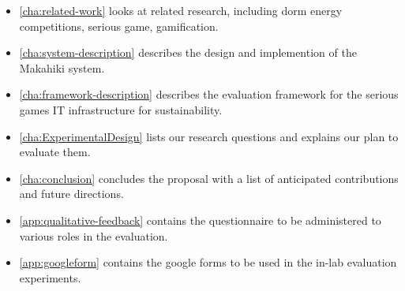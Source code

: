 \begin{itemize}
	\item \autoref{cha:related-work} looks at related research, including dorm energy competitions, serious game, gamification.
	\item \autoref{cha:system-description} describes the design and implemention of the Makahiki system.
    \item \autoref{cha:framework-description} describes the evaluation framework for the serious games IT infrastructure for sustainability.
	\item \autoref{cha:ExperimentalDesign} lists our research questions and explains our plan to evaluate them.
	\item \autoref{cha:conclusion} concludes the proposal with a list of anticipated contributions and future directions.
	\item \autoref{app:qualitative-feedback} contains the questionnaire to be administered to various roles in the evaluation.
    \item \autoref{app:googleform} contains the google forms to be used in the in-lab evaluation experiments.
\end{itemize}
